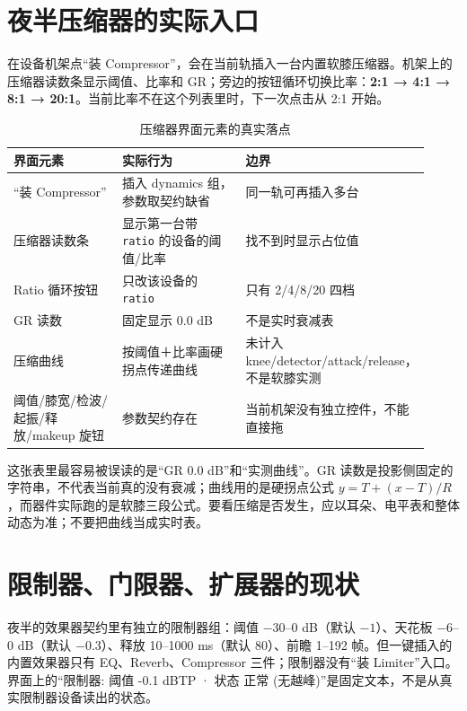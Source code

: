 \section{夜半压缩器的实际入口}

在设备机架点“装 Compressor”，会在当前轨插入一台内置软膝压缩器。机架上的压缩器读数条显示阈值、比率和 GR；旁边的按钮循环切换比率：\textbf{2:1 → 4:1 → 8:1 → 20:1}。当前比率不在这个列表里时，下一次点击从 2:1 开始。

\begin{table}[htbp]
\centering
\small
\begin{tabular}{@{}p{0.28\linewidth}p{0.34\linewidth}p{0.30\linewidth}@{}}
\hline
界面元素 & 实际行为 & 边界 \\
\hline
“装 Compressor” & 插入 dynamics 组，参数取契约缺省 & 同一轨可再插入多台 \\
压缩器读数条 & 显示第一台带 \texttt{ratio} 的设备的阈值/比率 & 找不到时显示占位值 \\
Ratio 循环按钮 & 只改该设备的 \texttt{ratio} & 只有 2/4/8/20 四档 \\
GR 读数 & 固定显示 0.0 dB & 不是实时衰减表 \\
压缩曲线 & 按阈值＋比率画硬拐点传递曲线 & 未计入 knee/detector/attack/release，不是软膝实测 \\
阈值/膝宽/检波/起振/释放/makeup 旋钮 & 参数契约存在 & 当前机架没有独立控件，不能直接拖 \\
\hline
\end{tabular}
\caption{压缩器界面元素的真实落点}
\label{tab:comp-ui}
\end{table}

这张表里最容易被误读的是“GR 0.0 dB”和“实测曲线”。GR 读数是投影侧固定的字符串，不代表当前真的没有衰减；曲线用的是硬拐点公式 $y=T+(x-T)/R$，而器件实际跑的是软膝三段公式。要看压缩是否发生，应以耳朵、电平表和整体动态为准；不要把曲线当成实时表。


\section{限制器、门限器、扩展器的现状}

夜半的效果器契约里有独立的限制器组：阈值 $-30$–$0$ dB（默认 $-1$）、天花板 $-6$–$0$ dB（默认 $-0.3$）、释放 10–1000 ms（默认 80）、前瞻 1–192 帧。但一键插入的内置效果器只有 EQ、Reverb、Compressor 三件；限制器没有“装 Limiter”入口。界面上的“限制器: 阈值 -0.1 dBTP · 状态 正常 (无越峰)”是固定文本，不是从真实限制器设备读出的状态。

